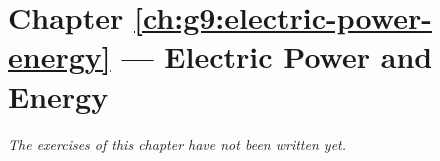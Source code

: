 \section*{Chapter \ref{ch:g9:electric-power-energy} --- Electric Power and Energy}


\emph{The exercises of this chapter have not been written yet.}
